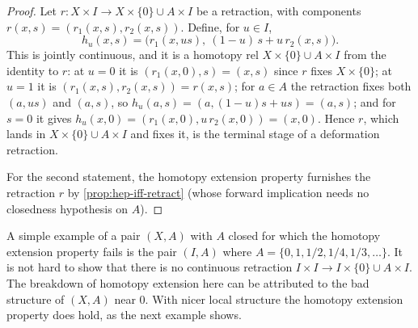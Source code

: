 \begin{proof}
\leanok
Let $r : X \times I \to X \times \{0\} \cup A \times I$ be a retraction, with components
$r(x,s) = (r_1(x,s), r_2(x,s))$. Define, for $u \in I$,
\[
h_u(x,s) = \bigl( r_1(x, us),\ (1-u)\,s + u\,r_2(x,s) \bigr).
\]
This is jointly continuous, and it is a homotopy rel $X \times \{0\} \cup A \times I$
from the identity to $r$: at $u = 0$ it is $(r_1(x,0), s) = (x,s)$ since $r$ fixes
$X \times \{0\}$; at $u = 1$ it is $(r_1(x,s), r_2(x,s)) = r(x,s)$; for $a \in A$ the
retraction fixes both $(a, us)$ and $(a, s)$, so
$h_u(a,s) = (a, (1-u)s + us) = (a,s)$; and for $s = 0$ it gives
$h_u(x,0) = (r_1(x,0), u\,r_2(x,0)) = (x, 0)$. Hence $r$, which lands in
$X \times \{0\} \cup A \times I$ and fixes it, is the terminal stage of a deformation
retraction.

For the second statement, the homotopy extension property furnishes the retraction
$r$ by \cref{prop:hep-iff-retract} (whose forward implication needs no closedness
hypothesis on $A$).
\end{proof}

\begin{example}
\label{ex:hep-fails-for-bad-subspace}
A simple example of a pair $(X,A)$ with $A$ closed for which the homotopy
extension property fails is the pair $(I,A)$ where $A = \{0,1,1/2,1/4,1/3,\ldots\}$. It is
not hard to show that there is no continuous retraction
$I \times I \to I \times \{0\} \cup A \times I$. The breakdown of homotopy extension here can be
attributed to the bad structure of $(X,A)$ near $0$. With nicer local structure the
homotopy extension property does hold, as the next example shows.
\end{example}

